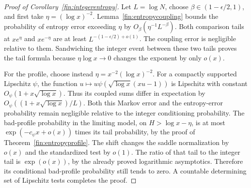 \begin{proof}[Proof of Corollary~\ref{fin:integerentropy}]

Let $L=\log N$, choose $\beta\in(1-\epsilon/2,1)$, and first take
$\eta=(\log x)^{-2}$.  Lemma~\ref{fin:entropycoupling} bounds the
probability of entropy error exceeding $\eta$ by
$O_\beta(\eta^{-1}L^{-\beta})$.
Both comparison tails at $xe^\eta$ and $xe^{-\eta}$ are at least
$L^{-(1-\epsilon/2)+o(1)}$.
The coupling error is negligible relative to them.  Sandwiching the
integer event between these two tails proves the tail formula because
$\eta\log x\to0$ changes the exponent by only $o(x)$.

For the profile, choose instead
$\eta=x^{-2}(\log x)^{-2}$.  For a compactly supported Lipschitz $\psi$,
the function
$u\mapsto u\psi(\sqrt{\log x}(xu-1))$ is Lipschitz with constant
$O_\psi(1+x\sqrt{\log x})$.  Thus its coupled sums differ in expectation
by $O_\psi((1+x\sqrt{\log x})/L)$.
Both this Markov error and the entropy-error probability remain
negligible relative to the integer conditioning probability.
The bad-profile probability in the limiting model, on
$H>\log x-\eta$, is at most
$\exp(-c_\psi x+o(x))$ times its tail probability, by the proof of
Theorem~\ref{fin:entropyprofile}.  The shift changes the saddle
normalization by $o(x)$ and the standardized test by $o(1)$.
The ratio of that tail to the integer tail is $\exp(o(x))$, by the
already proved logarithmic asymptotics.  Therefore its conditional
bad-profile probability still tends to zero.  A countable determining
set of Lipschitz tests completes the proof.
\end{proof}


